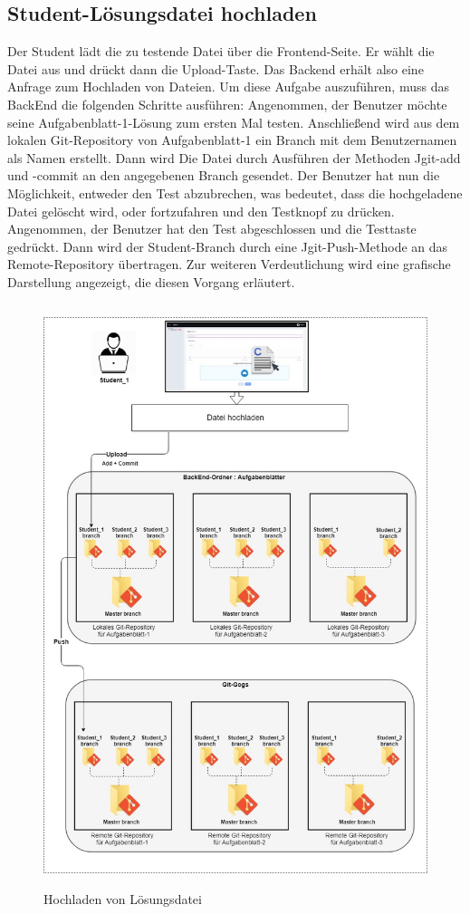 \documentclass[a4paper,12pt,oneside]{book}
\begin{document}
\subsection{Student-Lösungsdatei hochladen}
Der Student lädt die zu testende Datei über die Frontend-Seite. Er wählt die Datei aus und drückt dann die Upload-Taste. Das Backend erhält also eine Anfrage zum Hochladen von Dateien. Um diese Aufgabe auszuführen, muss das BackEnd die folgenden Schritte ausführen: Angenommen, der Benutzer möchte seine Aufgabenblatt-1-Lösung zum ersten Mal testen. Anschließend wird aus dem lokalen Git-Repository von Aufgabenblatt-1 ein Branch mit dem Benutzernamen als Namen erstellt. Dann wird Die Datei durch Ausführen der Methoden Jgit-add und -commit an den angegebenen Branch gesendet. Der Benutzer hat nun die Möglichkeit, entweder den Test abzubrechen, was bedeutet, dass die hochgeladene Datei gelöscht wird, oder fortzufahren und den Testknopf zu drücken. Angenommen, der Benutzer hat den Test abgeschlossen und die Testtaste gedrückt. Dann wird der Student-Branch durch eine Jgit-Push-Methode an das Remote-Repository übertragen. Zur weiteren Verdeutlichung wird eine grafische Darstellung angezeigt, die diesen Vorgang erläutert.
\begin{figure}[h!]
	\begin{center}
		\includegraphics[width=16cm, height=17cm]{Loesungupload.jpg}
		\caption{Hochladen von Lösungsdatei} 
		\label{ Hochladen von Lösungsdatei } 
	\end{center}
\end{figure}
\end{document}
